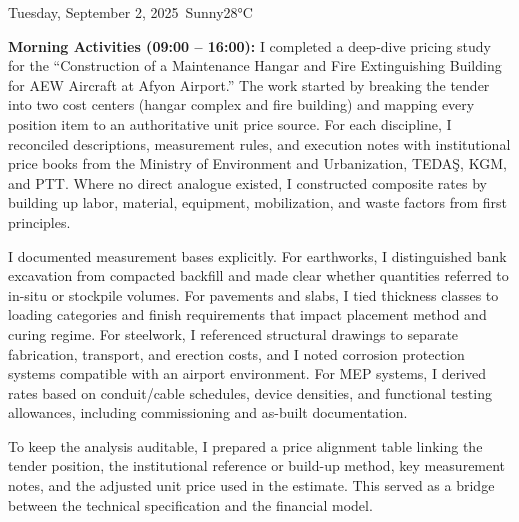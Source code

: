 \begin{dailyentry}{Tuesday, September 2, 2025}{\weathersunny\ Sunny}{28°C}

\begin{workcontent}
\textbf{Morning Activities (09:00 – 16:00):} I completed a deep-dive pricing study for the “Construction of a Maintenance Hangar and Fire Extinguishing Building for AEW Aircraft at Afyon Airport.” The work started by breaking the tender into two cost centers (hangar complex and fire building) and mapping every position item to an authoritative unit price source. For each discipline, I reconciled descriptions, measurement rules, and execution notes with institutional price books from the Ministry of Environment and Urbanization, TEDAŞ, KGM, and PTT. Where no direct analogue existed, I constructed composite rates by building up labor, material, equipment, mobilization, and waste factors from first principles.

I documented measurement bases explicitly. For earthworks, I distinguished bank excavation from compacted backfill and made clear whether quantities referred to in-situ or stockpile volumes. For pavements and slabs, I tied thickness classes to loading categories and finish requirements that impact placement method and curing regime. For steelwork, I referenced structural drawings to separate fabrication, transport, and erection costs, and I noted corrosion protection systems compatible with an airport environment. For MEP systems, I derived rates based on conduit/cable schedules, device densities, and functional testing allowances, including commissioning and as-built documentation.

To keep the analysis auditable, I prepared a price alignment table linking the tender position, the institutional reference or build-up method, key measurement notes, and the adjusted unit price used in the estimate. This served as a bridge between the technical specification and the financial model.


\end{workcontent}
\end{dailyentry}

